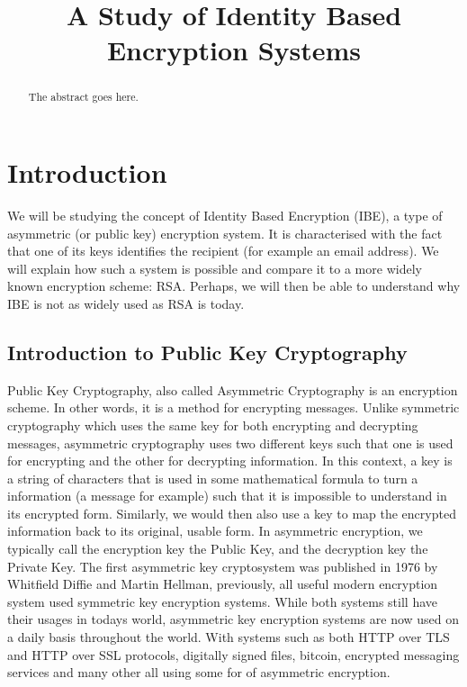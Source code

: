 \documentclass[conference]{IEEEtran}
\begin{document}
\title{A Study of Identity Based Encryption Systems}

\author{
}

\maketitle
\begin{abstract}
The abstract goes here.
\end{abstract}

\section{Introduction}
We will be studying the concept of Identity Based Encryption (IBE),
a type of asymmetric (or public key) encryption system.
It is characterised with the fact that one of its keys identifies the recipient
(for example an email address). We will explain how such a system is possible
and compare it to a more widely known encryption scheme: RSA. Perhaps, we will
then be able to understand why IBE is not as widely used as RSA is today. 

\subsection{Introduction to Public Key Cryptography}
Public Key Cryptography, also called Asymmetric Cryptography is an 
encryption scheme. In other words, it is a method for encrypting messages.
Unlike symmetric cryptography which uses the same key for both encrypting and decrypting
messages, asymmetric cryptography uses two different keys such that one 
is used for encrypting and the other for decrypting information.
In this context, a key is a string of characters that is used in some mathematical
formula to turn a information (a message for example) such that it is impossible to understand in its encrypted form. 
Similarly, we would then also use a key to map the encrypted information back to its original, usable form.
In asymmetric encryption, we typically call the encryption key
the Public Key, and the decryption key the Private Key.
The first asymmetric key cryptosystem was published in 1976 by Whitfield Diffie and Martin Hellman, previously,
all useful modern encryption system used symmetric key encryption systems. 
While both systems still have their usages in todays world,
asymmetric key encryption systems are now used on a daily basis throughout the world. With 
systems such as both HTTP over TLS and HTTP over SSL protocols, digitally signed files, bitcoin,
encrypted messaging services and many other all using some for of asymmetric encryption. 
\end{document}
